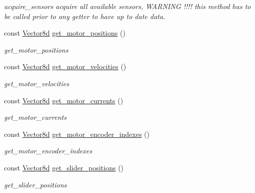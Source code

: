 \begin{DoxyCompactItemize}
\begin{DoxyCompactList}\small\item\em acquire\+\_\+sensors acquire all available sensors, W\+A\+R\+N\+I\+NG !!!! this method has to be called prior to any getter to have up to date data. \end{DoxyCompactList}\item 
const \hyperlink{common__header_8hpp_a98975ffbe0bca1296078e0350dfedd60}{Vector8d} \hyperlink{classblmc__robots_1_1TestBench8Motors_a9372bd2722944fa510aa56323f8955b8}{get\+\_\+motor\+\_\+positions} ()
\begin{DoxyCompactList}\small\item\em get\+\_\+motor\+\_\+positions \end{DoxyCompactList}\item 
const \hyperlink{common__header_8hpp_a98975ffbe0bca1296078e0350dfedd60}{Vector8d} \hyperlink{classblmc__robots_1_1TestBench8Motors_aaf4aa80251af98000ffad95eddf0b449}{get\+\_\+motor\+\_\+velocities} ()
\begin{DoxyCompactList}\small\item\em get\+\_\+motor\+\_\+velocities \end{DoxyCompactList}\item 
const \hyperlink{common__header_8hpp_a98975ffbe0bca1296078e0350dfedd60}{Vector8d} \hyperlink{classblmc__robots_1_1TestBench8Motors_a9bac22cb6522afd6412e8fbb56f11fbf}{get\+\_\+motor\+\_\+currents} ()
\begin{DoxyCompactList}\small\item\em get\+\_\+motor\+\_\+currents \end{DoxyCompactList}\item 
const \hyperlink{common__header_8hpp_a98975ffbe0bca1296078e0350dfedd60}{Vector8d} \hyperlink{classblmc__robots_1_1TestBench8Motors_ab1d81b573c721e5c8ad400ed4fb4d6ef}{get\+\_\+motor\+\_\+encoder\+\_\+indexes} ()
\begin{DoxyCompactList}\small\item\em get\+\_\+motor\+\_\+encoder\+\_\+indexes \end{DoxyCompactList}\item 
const \hyperlink{common__header_8hpp_a98975ffbe0bca1296078e0350dfedd60}{Vector8d} \hyperlink{classblmc__robots_1_1TestBench8Motors_a11bdbb6f0e4dd0824075ba309f69ad3a}{get\+\_\+slider\+\_\+positions} ()
\begin{DoxyCompactList}\small\item\em get\+\_\+slider\+\_\+positions \end{DoxyCompactList}\item 

\end{DoxyCompactItemize}
